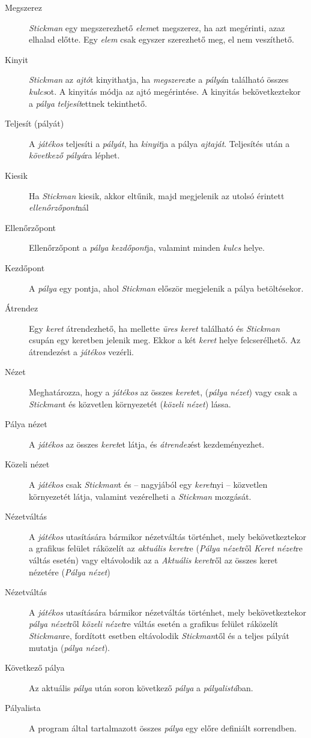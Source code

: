 \begin{description}
    \item[Megszerez] \emph{Stickman} egy megszerezhető \emph{elem}et megszerez, ha azt megérinti, azaz elhalad előtte. Egy \emph{elem} csak egyszer szerezhető meg, el nem veszíthető.
    \item[Kinyit] \emph{Stickman} az \emph{ajtó}t kinyithatja, ha \emph{megszerez}te a \emph{pályá}n található összes \emph{kulcs}ot. A kinyitás módja az ajtó megérintése. A kinyitás bekövetkeztekor a \emph{pálya} \emph{teljesít}ettnek tekinthető.
    \item[Teljesít (pályát)] A \emph{játékos} teljesíti a \emph{pályát}, ha \emph{kinyit}ja a pálya \emph{ajtaját}. Teljesítés után a \emph{következő pályá}ra léphet.
    \item[Kiesik] Ha \emph{Stickman} kiesik, akkor eltűnik, majd megjelenik az utolsó érintett \emph{ellenőrzőpont}nál
    \item[Ellenőrzőpont] Ellenőrzőpont a \emph{pálya} \emph{kezdőpont}ja, valamint minden \emph{kulcs} helye.
    \item[Kezdőpont] A \emph{pálya} egy pontja, ahol \emph{Stickman} először megjelenik a pálya betöltésekor.
    \item[Átrendez] Egy \emph{keret} átrendezhető, ha mellette \emph{üres keret} található és \emph{Stickman} csupán egy keretben jelenik meg. Ekkor a két \emph{keret} helye felcserélhető. Az átrendezést a \emph{játékos} vezérli.
    \item[Nézet] Meghatározza, hogy a \emph{játékos} az összes \emph{keret}et, (\emph{pálya nézet}) vagy csak a \emph{Stickman}t és közvetlen környezetét (\emph{közeli nézet}) lássa.
    \item[Pálya nézet] A \emph{játékos} az összes \emph{keret}et látja, és \emph{átrendez}ést kezdeményezhet.
    \item[Közeli nézet] A \emph{játékos} csak \emph{Stickman}t és -- nagyjából egy \emph{keret}nyi -- közvetlen környezetét látja, valamint vezérelheti a \emph{Stickman} mozgását.
    \item[Nézetváltás] A \emph{játékos} utasítására bármikor nézetváltás történhet, mely bekövetkeztekor a grafikus felület ráközelít az \emph{aktuális keret}re (\emph{Pálya nézet}ről \emph{Keret nézet}re váltás esetén) vagy eltávolodik az a \emph{Aktuális keret}ről az összes keret nézetére (\emph{Pálya nézet})
    \item[Nézetváltás] A \emph{játékos} utasítására bármikor nézetváltás történhet, mely bekövetkeztekor \emph{pálya nézet}ről \emph{közeli nézet}re váltás esetén a grafikus felület ráközelít \emph{Stickman}re, fordított esetben eltávolodik \emph{Stickman}től és a teljes pályát mutatja (\emph{pálya nézet}).
    \item[Következő pálya] Az aktuális \emph{pálya} után soron következő \emph{pálya} a \emph{pályalistá}ban.
    \item[Pályalista] A program által tartalmazott összes \emph{pálya} egy előre definiált sorrendben.

\end{description}


